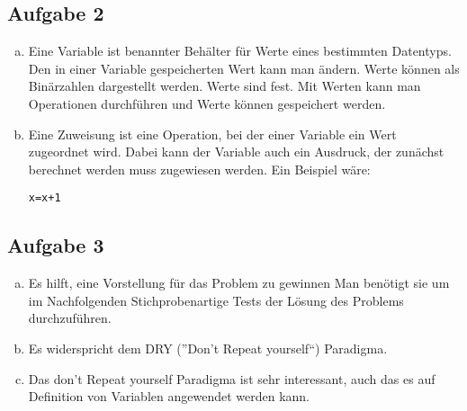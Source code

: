 \documentclass[11pt]{article}
\begin{document}
\subsection*{Aufgabe 2}
\begin{enumerate}[a)]

\item Eine Variable ist benannter Beh\"alter f\"ur Werte eines bestimmten Datentyps. Den in einer Variable gespeicherten Wert kann man \"andern. Werte k\"onnen als Bin\"arzahlen dargestellt werden. Werte sind fest. Mit Werten kann man Operationen durchf\"uhren und Werte k\"onnen gespeichert werden.

\item Eine Zuweisung ist eine Operation, bei der einer Variable ein Wert zugeordnet wird. Dabei kann der Variable auch ein Ausdruck, der zun\"achst  berechnet werden muss zugewiesen werden. Ein Beispiel w\"are:
\begin{lstlisting}
x=x+1
\end{lstlisting}

\end{enumerate}
\subsection*{Aufgabe 3}
\begin{enumerate}[a)]
  \item Es hilft, eine Vorstellung f\"ur das Problem zu gewinnen
    Man ben\"otigt sie um im Nachfolgenden Stichprobenartige Tests
    der L\"osung des Problems durchzuf\"uhren.
  \item
    Es widerspricht dem DRY (''Don't Repeat yourself``) Paradigma.
  \item
    Das don't Repeat yourself Paradigma ist sehr interessant, auch das es auf
    Definition von Variablen angewendet werden kann.
\end{enumerate}
\end{document}
